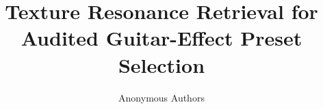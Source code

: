 \documentclass[journal,10pt]{IEEEtran}
\title{Texture Resonance Retrieval for Audited Guitar-Effect Preset Selection}
\author{Anonymous Authors}
\begin{document}
\newcommand{\paperbibliostyle}{IEEEtranN}

\end{document}
